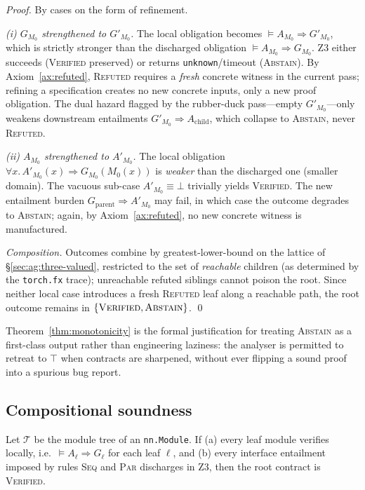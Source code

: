 \begin{proof}
By cases on the form of refinement.

\emph{(i) $G_{M_0}$ strengthened to $G'_{M_0}$.}
The local obligation becomes $\models A_{M_0}\Rightarrow G'_{M_0}$,
which is strictly stronger than the discharged obligation
$\models A_{M_0}\Rightarrow G_{M_0}$.  Z3 either succeeds
(\textsc{Verified} preserved) or returns
\texttt{unknown}/timeout (\textsc{Abstain}).  By
Axiom~\ref{ax:refuted}, \textsc{Refuted} requires a \emph{fresh}
concrete witness in the current pass; refining a specification creates
no new concrete inputs, only a new proof obligation.  The dual hazard
flagged by the rubber-duck pass---empty $G'_{M_0}$---only weakens
downstream entailments $G'_{M_0}\!\Rightarrow\!A_{\text{child}}$, which
collapse to \textsc{Abstain}, never \textsc{Refuted}.

\emph{(ii) $A_{M_0}$ strengthened to $A'_{M_0}$.}
The local obligation $\forall x.\,A'_{M_0}(x)\!\Rightarrow\!G_{M_0}(M_0(x))$
is \emph{weaker} than the discharged one (smaller domain).  The vacuous
sub-case $A'_{M_0}\equiv\bot$ trivially yields \textsc{Verified}.  The
new entailment burden $G_{\text{parent}}\!\Rightarrow\!A'_{M_0}$ may
fail, in which case the outcome degrades to \textsc{Abstain}; again,
by Axiom~\ref{ax:refuted}, no new concrete witness is manufactured.

\emph{Composition.}  Outcomes combine by greatest-lower-bound on the
lattice of \S\ref{sec:ag:three-valued}, restricted to the set of
\emph{reachable} children (as determined by the \texttt{torch.fx} trace);
unreachable refuted siblings cannot poison the root.  Since neither
local case introduces a fresh \textsc{Refuted} leaf along a reachable
path, the root outcome remains in $\{\textsc{Verified},\textsc{Abstain}\}$.
\qed
\end{proof}

Theorem~\ref{thm:monotonicity} is the formal justification for treating
\textsc{Abstain} as a first-class output rather than engineering laziness:
the analyser is permitted to retreat to $\top$ when contracts are
sharpened, without ever flipping a sound proof into a spurious bug
report.

\subsection{Compositional soundness}
\label{sec:ag:soundness}

\begin{theorem}
\label{thm:soundness}
Let $\mathcal{T}$ be the module tree of an \texttt{nn.Module}.  If
(a) every leaf module verifies locally, i.e.\
$\models A_\ell\Rightarrow G_\ell$ for each leaf $\ell$, and
(b) every interface entailment imposed by rules \textsc{Seq} and
\textsc{Par} discharges in Z3, then the root contract is
\textsc{Verified}.
\end{theorem}

